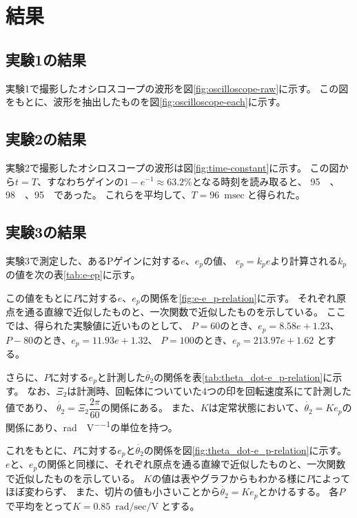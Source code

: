 \documentclass[../../../main]{subfiles}
\begin{document}
\section{結果}\label{sec:result}

\subsection{実験1の結果}
実験1で撮影したオシロスコープの波形を図\ref{fig:oscilloscope-raw}に示す。
この図をもとに、波形を抽出したものを図\ref{fig:oscilloscope-each}に示す。

\clearpage
\subsection{実験2の結果}
実験2で撮影したオシロスコープの波形は図\ref{fig:time-constant}に示す。
この図から$t=T$、すなわちゲインの$1-e^{-1}\approx63.2\%$となる時刻を読み取ると、
\SI{95}{\milli\sec}、\SI{98}{\milli\sec}、\SI{95}{\milli\sec}であった。
これらを平均して、$T = \SI{96}{\milli\sec}$と得られた。

\clearpage
\subsection{実験3の結果}
実験3で測定した、あるPゲインに対する$e$、$e_p$の値、
$e_p = k_p e$より計算される$k_p$の値を次の表\ref{tab:e-ep}に示す。

この値をもとに$P$に対する$e$、$e_p$の関係を\ref{fig:e-e_p-relation}に示す。
それぞれ原点を通る直線で近似したものと、一次関数で近似したものを示している。
ここでは、得られた実験値に近いものとして、
$P=60$のとき、$e_p = 8.58e + 1.23$、
$P-80$のとき、$e_p = 11.93e + 1.32$、
$P=100$のとき、$e_p = 213.97e + 1.62$
とする。


さらに、$P$に対する$e_p$と計測した$\dot{\theta_2}$の関係を表\ref{tab:theta_dot-e_p-relation}に示す。
なお、$\Xi_2$は計測時、回転体についていた4つの印を回転速度系にて計測した値であり、
$\dot{\theta_2} = \Xi_2 \dfrac{2\pi}{60}$の関係にある。
また、$K$は定常状態において、$\dot{\theta_2} = K e_p$の関係にあり、\si{\radian\per\sec\per\volt}の単位を持つ。

これをもとに、$P$に対する$e_p$と$\dot{\theta_2}$の関係を図\ref{fig:theta_dot-e_p-relation}に示す。
$e$と、$e_p$の関係と同様に、それぞれ原点を通る直線で近似したものと、一次関数で近似したものを示している。
$K$の値は表やグラフからもわかる様に$P$によってほぼ変わらず、
また、切片の値も小さいことから$\dot{\theta_2}=K e_p$とかけるする。
各$P$で平均をとって$K=\SI{0.85}{\radian\per\sec\per\volt}$とする。

\end{document}
